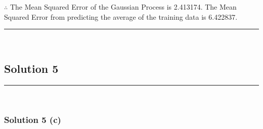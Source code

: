 \documentclass{article}
\begin{document}
\subsubsection*{\normalfont}{$\therefore$ The Mean Squared Error of the Gaussian Process is 2.413174. The Mean Squared Error from predicting the average of the training data is 6.422837.}

\noindent\rule{\textwidth}{0.4pt}\\

\newpage

\subsection*{Solution 5}
\noindent\rule{\textwidth}{0.4pt}\\
\subsubsection*{Solution 5 (c)}
\end{document}
